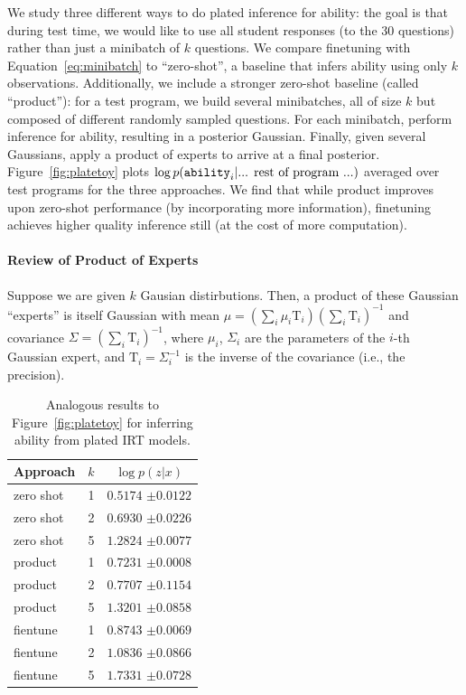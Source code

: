 We study three different ways to do plated inference for ability: the goal is that during test time, we would like to use all student responses (to the 30 questions) rather than just a minibatch of $k$ questions. We compare finetuning with Equation~\ref{eq:minibatch} to ``zero-shot'', a baseline that infers ability using only $k$ observations. Additionally, we include a stronger zero-shot baseline (called ``product''): for a test program, we build several minibatches, all of size $k$ but composed of different randomly sampled questions. For each minibatch, perform inference for ability, resulting in a posterior Gaussian. Finally, given several Gaussians, apply a product of experts \cite{hinton2002training,wu2018multimodal} to arrive at a final posterior. Figure~\ref{fig:platetoy} plots $\log p(\texttt{ability}_i | \textup{... rest of program ...})$ averaged over test programs for the three approaches. We find that while product improves upon zero-shot performance (by incorporating more information), finetuning achieves higher quality inference still (at the cost of more computation).

\paragraph{Review of Product of Experts} Suppose we are given $k$ Gausian distirbutions. Then, a product of these Gaussian ``experts'' is itself Gaussian \cite{cao2014generalized} with mean $\mu = (\sum_{i} \mu_{i}\text{T}_{i})(\sum_{i}\text{T}_{i})^{-1}$ and covariance $\Sigma = (\sum_{i} \text{T}_{i})^{-1}$, where $\mu_{i}$, $\Sigma_{i}$ are the parameters of the $i$-th Gaussian expert, and $\text{T}_{i} = \Sigma_{i}^{-1}$ is the inverse of the covariance (i.e., the precision).

\begin{table}[h!]
\centering
\begin{tabular}{lcc}
\toprule
Approach & $k$ & $\log p(z|x)$ \\
\midrule
zero shot & 1 & $0.5174$ {\tiny$\pm 0.0122$} \\
zero shot & 2 & $0.6930$ {\tiny$\pm 0.0226$} \\
zero shot & 5 & $1.2824$ {\tiny$\pm 0.0077$} \\
\midrule
product & 1 & $0.7231$ {\tiny$\pm 0.0008$} \\
product & 2 & $0.7707$ {\tiny$\pm 0.1154$} \\
product & 5 & $1.3201$ {\tiny$\pm 0.0858$} \\
\midrule
fientune & 1 & $0.8743$ {\tiny$\pm 0.0069$} \\
fientune & 2 & $1.0836$ {\tiny$\pm 0.0866$} \\
fientune & 5 & $1.7331$ {\tiny$\pm 0.0728$} \\
\bottomrule
\end{tabular}
\caption{Analogous results to Figure~\ref{fig:platetoy} for inferring ability from plated IRT models.}
\label{tab:toy:irt}
\end{table}


